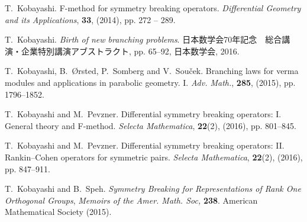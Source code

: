 \begin{thebibliography}{CK{\O}P11}
T.~Kobayashi.
\newblock F-method for symmetry breaking operators.
\newblock \emph{Differential Geometry and its Applications}, \textbf{33},
  (2014), pp. 272 -- 289.

T.~Kobayashi.
\newblock \emph{Birth of new branching problems}.
\newblock
  日本数学会70年記念　総合講演・企業特別講演アブストラクト, pp. 65--92,
  日本数学会, 2016.

T.~Kobayashi, B.~{\O}rsted, P.~Somberg and V.~Sou{\v{c}}ek.
\newblock Branching laws for verma modules and applications in parabolic
  geometry. {I}.
\newblock \emph{Adv. Math.}, \textbf{285}, (2015), pp. 1796--1852.

T.~Kobayashi and M.~Pevzner.
\newblock Differential symmetry breaking operators: I. {G}eneral theory and
  {F}-method.
\newblock \emph{Selecta Mathematica}, \textbf{22}(2), (2016), pp. 801--845.

T.~Kobayashi and M.~Pevzner.
\newblock Differential symmetry breaking operators: {I}{I}. {R}ankin--{C}ohen
  operators for symmetric pairs.
\newblock \emph{Selecta Mathematica}, \textbf{22}(2), (2016), pp. 847--911.

T.~Kobayashi and B.~Speh.
\newblock \emph{Symmetry {B}reaking for {R}epresentations of {R}ank {O}ne
  {O}rthogonal {G}roups}, \emph{Memoirs of the Amer. Math. Soc,} \textbf{238}.
\newblock American Mathematical Society (2015).

\end{thebibliography}
